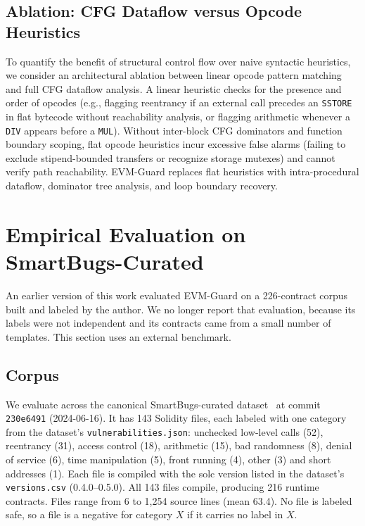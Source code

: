 \documentclass[pdflatex,sn-mathphys]{sn-jnl}
\theoremstyle{thmstyleone}
\theoremstyle{thmstyletwo}
\begin{document}
\subsection{Ablation: CFG Dataflow versus Opcode Heuristics}\label{sec:arch:ablation_design}
To quantify the benefit of structural control flow over naive syntactic heuristics, we consider an architectural ablation between linear opcode pattern matching and full CFG dataflow analysis. A linear heuristic checks for the presence and order of opcodes (e.g., flagging reentrancy if an external call precedes an \texttt{SSTORE} in flat bytecode without reachability analysis, or flagging arithmetic whenever a \texttt{DIV} appears before a \texttt{MUL}). Without inter-block CFG dominators and function boundary scoping, flat opcode heuristics incur excessive false alarms (failing to exclude stipend-bounded transfers or recognize storage mutexes) and cannot verify path reachability. EVM-Guard replaces flat heuristics with intra-procedural dataflow, dominator tree analysis, and loop boundary recovery.

\section{Empirical Evaluation on SmartBugs-Curated}\label{sec:results}

An earlier version of this work evaluated EVM-Guard on a 226-contract corpus built and labeled by the author. We no longer report that evaluation, because its labels were not independent and its contracts came from a small number of templates. This section uses an external benchmark.

\subsection{Corpus}\label{sec:results:corpus}
We evaluate across the canonical SmartBugs-curated dataset~\cite{durieux2020empirical,ferreira2020smartbugs} at commit \texttt{230e6491} (2024-06-16). It has 143 Solidity files, each labeled with one category from the dataset's \texttt{vulnerabilities.json}: unchecked low-level calls (52), reentrancy (31), access control (18), arithmetic (15), bad randomness (8), denial of service (6), time manipulation (5), front running (4), other (3) and short addresses (1). Each file is compiled with the solc version listed in the dataset's \texttt{versions.csv} (0.4.0--0.5.0). All 143 files compile, producing 216 runtime contracts. Files range from 6 to 1,254 source lines (mean 63.4). No file is labeled safe, so a file is a negative for category $X$ if it carries no label in $X$.
\end{document}
